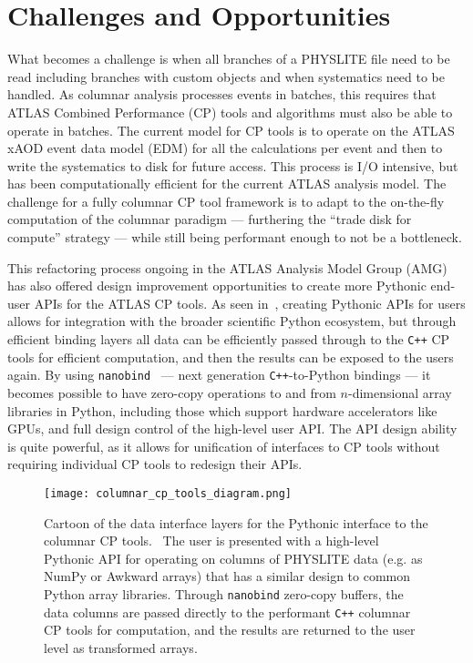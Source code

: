 \section{Challenges and Opportunities}\label{sec:challenges}

What becomes a challenge is when all branches of a PHYSLITE file need to be read including branches with custom objects and when systematics need to be handled.
As columnar analysis processes events in batches, this requires that ATLAS Combined Performance (CP) tools and algorithms must also be able to operate in batches.
The current model for CP tools is to operate on the ATLAS xAOD event data model (EDM) for all the calculations per event and then to write the systematics to disk for future access.
This process is I/O intensive, but has been computationally efficient for the current ATLAS analysis model.
The challenge for a fully columnar CP tool framework is to adapt to the on-the-fly computation of the columnar paradigm --- furthering the ``trade disk for compute'' strategy --- while still being performant enough to not be a bottleneck.

This refactoring process ongoing in the ATLAS Analysis Model Group (AMG) has also offered design improvement opportunities to create more Pythonic end-user APIs for the ATLAS CP tools.
As seen in~, creating Pythonic APIs for users allows for integration with the broader scientific Python ecosystem, but through efficient binding layers all data can be efficiently passed through to the \texttt{C++} CP tools for efficient computation, and then the results can be exposed to the users again.
By using \texttt{nanobind}~\cite{nanobind} --- next generation \texttt{C++}-to-Python bindings --- it becomes possible to have zero-copy operations to and from $n$-dimensional array libraries in Python, including those which support hardware accelerators like GPUs, and full design control of the high-level user API.
The API design ability is quite powerful, as it allows for unification of interfaces to CP tools without requiring individual CP tools to redesign their APIs.

\begin{figure}
    \centering
    \texttt{[image: columnar\_cp\_tools\_diagram.png]}
    \caption{Cartoon of the data interface layers for the Pythonic interface to the columnar CP tools.~\cite{Vigl:ACAT_2024}
The user is presented with a high-level Pythonic API for operating on columns of PHYSLITE data (e.g. as NumPy or Awkward arrays) that has a similar design to common Python array libraries.
Through \texttt{nanobind} zero-copy buffers, the data columns are passed directly to the performant \texttt{C++} columnar CP tools for computation, and the results are returned to the user level as transformed arrays.}
    \label{fig:columnar_cp_tools_diagram}
\end{figure}
